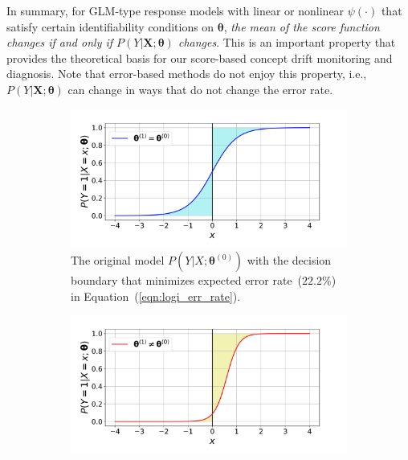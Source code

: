 \documentclass[twoside,11pt]{article}
\begin{document}
In summary, for GLM-type response models with linear or nonlinear $\psi(\cdot)$ that satisfy certain identifiability conditions on $\bm{\theta}$, \textit{the mean of the score function changes if and only if $P(Y|\bm{X};\bm{\theta})$ changes}. This is an important property that provides the theoretical basis for our score-based concept drift monitoring and diagnosis. Note that error-based methods do not enjoy this property, i.e., $P(Y|\bm{X};\bm{\theta})$ can change in ways that do not change the error rate.

\begin{figure}[!htbp]
\centering
 \begin{subfigure}[t]{0.4\linewidth}
         \centering
         \includegraphics[width=\textwidth, trim=.2in .2in .7in .45in, clip]{../figures/v14/demons_fig/2D_logi_orig.png}
         \captionsetup{width=.95\linewidth}
         \caption{The original model $P(Y|{X};\bm{\theta}^{(0)})$ with the decision boundary that minimizes expected error rate~($22.2\%$) in Equation~(\ref{eqn:logi_err_rate}).}
         \label{fig:logi_err_rate_unch_a}
  \end{subfigure}
  \begin{subfigure}[t]{0.4\linewidth}
         \centering
         \includegraphics[width=\textwidth, trim=.2in .2in .7in .45in, clip]{../figures/v14/demons_fig/2D_logi_cd.png}

\end{subfigure}
\end{figure}
\end{document}
